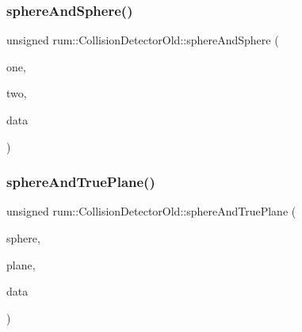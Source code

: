 \mbox{\label{classrum_1_1_collision_detector_old_a886afe59650dc1a0c3272855e27cd4a6}} 
\subsubsection{\texorpdfstring{sphere\+And\+Sphere()}{sphereAndSphere()}}
{\footnotesize\ttfamily unsigned rum\+::\+Collision\+Detector\+Old\+::sphere\+And\+Sphere (\begin{DoxyParamCaption}\item[{const \mbox{\hyperlink{classrum_1_1_collision_sphere}{Collision\+Sphere}} \&}]{one,  }\item[{const \mbox{\hyperlink{classrum_1_1_collision_sphere}{Collision\+Sphere}} \&}]{two,  }\item[{\mbox{\hyperlink{classrum_1_1_collision_data}{Collision\+Data}} $\ast$}]{data }\end{DoxyParamCaption})\hspace{0.3cm}{\ttfamily [static]}}

\mbox{\label{classrum_1_1_collision_detector_old_ab1aae557723a05e722e11c6f83f2e4f2}} 
\subsubsection{\texorpdfstring{sphere\+And\+True\+Plane()}{sphereAndTruePlane()}}
{\footnotesize\ttfamily unsigned rum\+::\+Collision\+Detector\+Old\+::sphere\+And\+True\+Plane (\begin{DoxyParamCaption}\item[{const \mbox{\hyperlink{classrum_1_1_collision_sphere}{Collision\+Sphere}} \&}]{sphere,  }\item[{const \mbox{\hyperlink{classrum_1_1_collision_plane}{Collision\+Plane}} \&}]{plane,  }\item[{\mbox{\hyperlink{classrum_1_1_collision_data}{Collision\+Data}} $\ast$}]{data }\end{DoxyParamCaption})\hspace{0.3cm}{\ttfamily [static]}}



